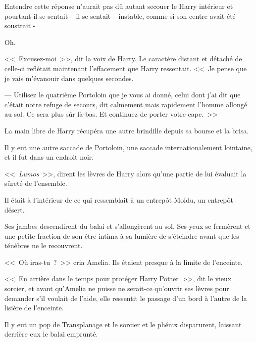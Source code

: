 Entendre cette réponse n'aurait pas dû autant secouer le Harry intérieur et pourtant il se sentait -- il se sentait -- instable, comme si son centre avait été soustrait -

Oh.

<<~Excusez-moi~>>, dit la voix de Harry. Le caractère distant et détaché de celle-ci reflétait maintenant l'effacement que Harry ressentait. <<~Je pense que je vais m'évanouir dans quelques secondes.

--- Utilisez le quatrième Portoloin que je vous ai donné, celui dont j'ai dit que c'était notre refuge de secours, dit calmement mais rapidement l'homme allongé au sol. Ce sera plus sûr là-bas. Et continuez de porter votre cape.~>>

La main libre de Harry récupéra une autre brindille depuis sa bourse et la brisa.

Il y eut une autre saccade de Portoloin, une saccade internationalement lointaine, et il fut dans un endroit noir.

<<~\emph{Lumos}~>>, dirent les lèvres de Harry alors qu'une partie de lui évaluait la sûreté de l'ensemble.

Il était à l'intérieur de ce qui ressemblait à un entrepôt Moldu, un entrepôt désert.

Ses jambes descendirent du balai et s'allongèrent au sol. Ses yeux se fermèrent et une petite fraction de son être intima à sa lumière de s'éteindre avant que les ténèbres ne le recouvrent.

\later

<<~Où iras-tu~?~>> cria Amelia. Ils étaient presque à la limite de l'enceinte.

<<~En arrière dans le temps pour protéger Harry Potter~>>, dit le vieux sorcier, et avant qu'Amelia ne puisse ne serait-ce qu'ouvrir ses lèvres pour demander s'il voulait de l'aide, elle ressentit le passage d'un bord à l'autre de la lisière de l'enceinte.

Il y eut un pop de Transplanage et le sorcier et le phénix disparurent, laissant derrière eux le balai emprunté.
